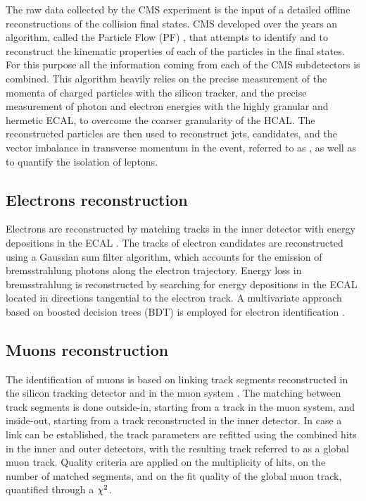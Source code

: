 The raw data collected by the CMS experiment is the input of a detailed offline reconstructions of the collision final states. CMS developed over the years an algorithm, called the Particle Flow (PF) \cite{CMS:2009nxa,CMS:2010byl}, that attempts to identify and to reconstruct the kinematic properties of each of the particles in the final states. For this purpose all the information coming from each of the CMS subdetectors is combined. This algorithm heavily relies on the precise measurement of the momenta of charged particles with the silicon tracker, and the precise measurement of photon and electron energies with the highly granular and hermetic ECAL, to overcome the coarser granularity of the HCAL. The reconstructed particles are then used to reconstruct jets, \hadtau candidates, and the vector imbalance in transverse momentum in the event, referred to as \ptvecmiss, as well as to quantify the isolation of leptons. 

\subsection{Electrons reconstruction}

Electrons are reconstructed by matching tracks in the inner detector with energy depositions in the ECAL \cite{CMS:2009nxa,Baffioni2007}. The tracks of electron candidates are reconstructed using a Gaussian sum ﬁlter \cite{Adam:2005bya} algorithm, which accounts for the emission of bremsstrahlung photons along the electron trajectory. Energy loss in bremsstrahlung is reconstructed by searching for energy depositions in the ECAL located in directions tangential to the electron track. A multivariate approach based on boosted decision trees (BDT) \cite{Hocker:2007ht} is employed for electron identification \cite{1748-0221-10-06-P06005}.

\subsection{Muons reconstruction}

 The identification of muons is based on linking track segments reconstructed in the silicon tracking detector and in the muon system \cite{Chatrchyan:2012xi}. The matching between track segments is done outside-in, starting from a track in the muon system, and inside-out, starting from a track reconstructed in the inner detector. In case a link can be established, the track parameters are refitted using the combined hits in the inner and outer detectors, with the resulting track referred to as a global muon track. Quality criteria are applied on the multiplicity of hits, on the number of matched segments, and on the ﬁt quality of the global muon track, quantified through a \ensuremath{\chisquare}.

